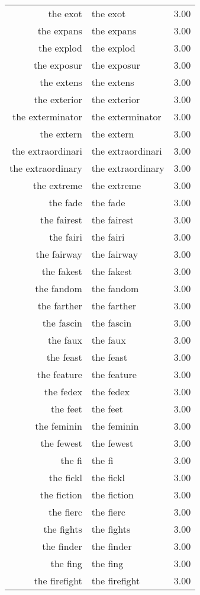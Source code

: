 \begin{table}[ht]
\begin{tabular}{rlr}
  the exot & the exot & 3.00 \\ 
  the expans & the expans & 3.00 \\ 
  the explod & the explod & 3.00 \\ 
  the exposur & the exposur & 3.00 \\ 
  the extens & the extens & 3.00 \\ 
  the exterior & the exterior & 3.00 \\ 
  the exterminator & the exterminator & 3.00 \\ 
  the extern & the extern & 3.00 \\ 
  the extraordinari & the extraordinari & 3.00 \\ 
  the extraordinary & the extraordinary & 3.00 \\ 
  the extreme & the extreme & 3.00 \\ 
  the fade & the fade & 3.00 \\ 
  the fairest & the fairest & 3.00 \\ 
  the fairi & the fairi & 3.00 \\ 
  the fairway & the fairway & 3.00 \\ 
  the fakest & the fakest & 3.00 \\ 
  the fandom & the fandom & 3.00 \\ 
  the farther & the farther & 3.00 \\ 
  the fascin & the fascin & 3.00 \\ 
  the faux & the faux & 3.00 \\ 
  the feast & the feast & 3.00 \\ 
  the feature & the feature & 3.00 \\ 
  the fedex & the fedex & 3.00 \\ 
  the feet & the feet & 3.00 \\ 
  the feminin & the feminin & 3.00 \\ 
  the fewest & the fewest & 3.00 \\ 
  the fi & the fi & 3.00 \\ 
  the fickl & the fickl & 3.00 \\ 
  the fiction & the fiction & 3.00 \\ 
  the fierc & the fierc & 3.00 \\ 
  the fights & the fights & 3.00 \\ 
  the finder & the finder & 3.00 \\ 
  the fing & the fing & 3.00 \\ 
  the firefight & the firefight & 3.00 \\ 

\end{tabular}
\end{table}
